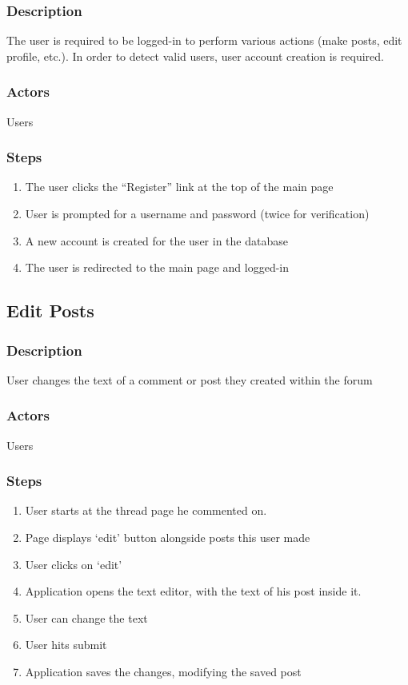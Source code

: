 \documentclass[12pt]{scrartcl}
\begin{document}
\subsubsection{Description}

The user is required to be logged-in to perform various actions (make posts, edit profile, etc.).
In order to detect valid users, user account creation is required. 

\subsubsection{Actors}

Users

\subsubsection{Steps}

\begin{enumerate}
\item The user clicks the ``Register'' link at the top of the main page
\item User is prompted for a username and password (twice for verification)
\item A new account is created for the user in the database
\item The user is redirected to the main page and logged-in
\end{enumerate}

\subsection{Edit Posts}
\subsubsection{Description}

User changes the text of a comment or post they created within the forum

\subsubsection{Actors}

Users

\subsubsection{Steps}

\begin{enumerate}
\item User starts at the thread page he commented on.
\item Page displays ‘edit’ button alongside posts this user made
\item User clicks on ‘edit’
\item Application opens the text editor, with the text of his post inside it.
\item User can change the text
\item User hits submit
\item  Application saves the changes, modifying the saved post
\end{enumerate}
\end{document}
